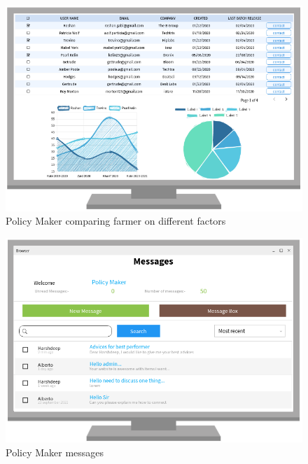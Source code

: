 \begin{figure}[H]
\begin{minipage}{0.48\textwidth}
		\label{Fig:interface_meteo}

	\end{minipage}\hfill

\end{figure}

\begin{figure}[H]

	\centering

	\includegraphics[width=0.8\columnwidth]{Images/visualize_farmers.png}

	\caption{Policy Maker comparing farmer on different factors}

	\label{Fig:interface_visu_farmers}

\end{figure}



\begin{figure}[H]

	\centering

	\includegraphics[width=0.8\columnwidth]{Images/messages_policy_maker.png}

	\caption{Policy Maker messages}

	\label{Fig:interface_messages_policy_maker}

\end{figure}

